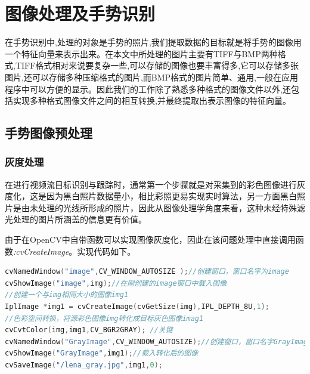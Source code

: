 \documentclass{XDBAthesis}
\begin{document}
\else
\fi
{}

\lstset{numbers=left,
extendedchars=false,
escapechar=@,style=customc
}
\chapter{图像处理及手势识别}

在手势识别中,处理的对象是手势的照片\cite{郭兴伟2003基于视觉的手势识别算法研究},我们提取数据的目标就是将手势的图像用一个特征向量来表示出来。在本文中所处理的图片主要有TIFF与BMP两种格式,TIFF格式相对来说要复杂一些,可以存储的图像也要丰富得多,它可以存储多张图片,还可以存储多种压缩格式的图片,而BMP格式的图片简单、通用,一般在应用程序中可以方便的显示。因此我们的工作除了熟悉多种格式的图像文件以外,还包括实现多种格式图像文件之间的相互转换,并最终提取出表示图像的特征向量。

\section{手势图像预处理}

\subsection{灰度处理}

在进行视频流目标识别与跟踪时，通常第一个步骤就是对采集到的彩色图像进行灰度化\cite{黄柏林2002基于边界特征的人脸识别}，这是因为黑白照片数据量小，相比彩照更易实现实时算法，另一方面黑白照片是由未处理的光线所形成的照片，因此从图像处理学角度来看，这种未经特殊滤光处理的图片所涵盖的信息更有价值。

由于在OpenCV中自带函数可以实现图像灰度化，因此在该问题处理中直接调用函数\emph{:cvCreateImage}。实现代码如下。
\begin{lstlisting}[language=C]
cvNamedWindow("image",CV_WINDOW_AUTOSIZE );//创建窗口，窗口名字为image
cvShowImage("image",img);//在刚创建的image窗口中载入图像
//创建一个与img相同大小的图像img1
IplImage *img1 = cvCreateImage(cvGetSize(img),IPL_DEPTH_8U,1);
//色彩空间转换，将源彩色图像img转化成目标灰色图像imag1
cvCvtColor(img,img1,CV_BGR2GRAY); //关键
cvNamedWindow("GrayImage",CV_WINDOW_AUTOSIZE);//创建窗口，窗口名字GrayImage
cvShowImage("GrayImage",img1);//载入转化后的图像
cvSaveImage("/lena_gray.jpg",img1,0);
\end{lstlisting}
%
%
\end{document}
